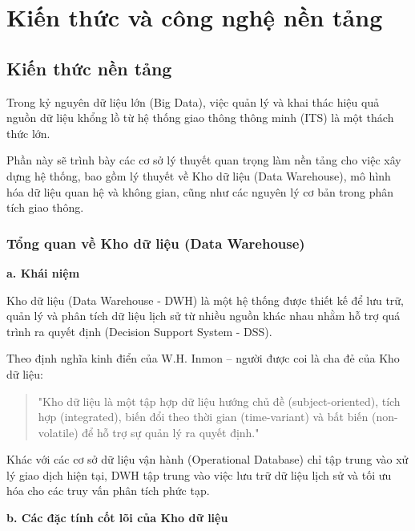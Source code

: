 \section{Kiến thức và công nghệ nền tảng}
\subsection{Kiến thức nền tảng}
Trong kỷ nguyên dữ liệu lớn (Big Data), việc quản lý và khai thác hiệu quả nguồn dữ liệu khổng lồ từ hệ thống giao thông thông minh (ITS) là một thách thức lớn.

Phần này sẽ trình bày các cơ sở lý thuyết quan trọng làm nền tảng cho việc xây dựng hệ thống, bao gồm lý thuyết về Kho dữ liệu (Data Warehouse), mô hình hóa dữ liệu quan hệ và không gian, cũng như các nguyên lý cơ bản trong phân tích giao thông.

\subsubsection{Tổng quan về Kho dữ liệu (Data Warehouse)}

\textbf{a. Khái niệm}

Kho dữ liệu (Data Warehouse - DWH) là một hệ thống được thiết kế để lưu trữ, quản lý và phân tích dữ liệu lịch sử từ nhiều nguồn khác nhau nhằm hỗ trợ quá trình ra quyết định (Decision Support System - DSS).

Theo định nghĩa kinh điển của W.H. Inmon – người được coi là cha đẻ của Kho dữ liệu:
\begin{quote}
"Kho dữ liệu là một tập hợp dữ liệu hướng chủ đề (subject-oriented), tích hợp (integrated), biến đổi theo thời gian (time-variant) và bất biến (non-volatile) để hỗ trợ sự quản lý ra quyết định."
\end{quote}

Khác với các cơ sở dữ liệu vận hành (Operational Database) chỉ tập trung vào xử lý giao dịch hiện tại, DWH tập trung vào việc lưu trữ dữ liệu lịch sử và tối ưu hóa cho các truy vấn phân tích phức tạp.

\textbf{b. Các đặc tính cốt lõi của Kho dữ liệu}

